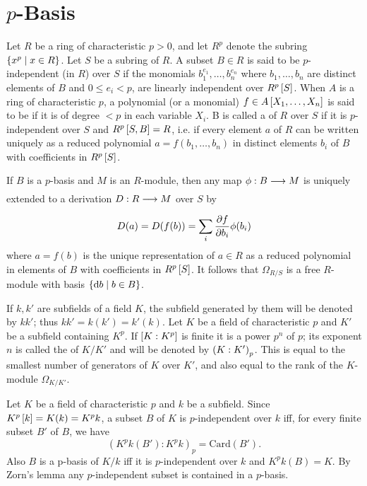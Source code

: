 \documentclass[../main]{subfiles}
\begin{document}
\section{\texorpdfstring{$p$}{p}-Basis}\label{sec:38}

\newparagraph
Let $R$ be a ring of characteristic $p > 0$, and let $R^p$ denote the subring $\left\{x^p \mid x \in R\right\}$. Let $S$ be a subring of $R$. A subset $B \in R$ is said to be $p$-independent (in $R$) over $S$ if the monomials $b_1^{e_1}, \dots, b_n^{e_n}$ where $b_1,\dots,b_n$ are distinct elements of $B$ and $0\le e_i < p$, are linearly independent over $R^p\left[S\right]$. When $A$ is a ring of characteristic $p$, a polynomial (or a monomial) $f \in A\left[X_1, \dots, X_n\right]$ is said to be  if it is of degree $< p$ in each variable $X_i$. B is called a  of $R$ over $S$ if it is $p$-independent over $S$ and $R^p\left[S,B\right] = R$, i.e. if every element $a$ of $R$ can be written uniquely as a reduced polynomial $a = f(b_1, \dots, b_n)$ in distinct elements $b_i$ of $B$ with coefficients in $R^p\left[S\right]$.

If $B$ is a $p$-basis and $M$ is an $R$-module, then any map $\phi: B \varrightarrow{} M$ is uniquely extended to a derivation $D: R \varrightarrow{} M$ over $S$ by \[D(a) = D(f(b)) = \sum_i \dfrac{\partial f}{\partial b_i}\phi(b_i)\] where $a=f(b)$ is the unique representation of $a \in R$ as a reduced polynomial in elements of $B$ with coefficients in $R^p\left[S\right]$. It follows that $\Omega_{R/S}$ is a free $R$-module with basis $\left\{\mathrm{d}b\mid b\in B\right\}$. 

\newparagraph
If $k,k'$ are subfields of a field $K$, the subfield generated by them will be denoted by $kk'$; thus $kk' = k(k') = k'(k)$. Let $K$ be a field of characteristic $p$ and $K'$ be a subfield containing $K^p$. If $\left[K:K^p\right]$ is finite it is a power $p^n$ of $p$; its exponent $n$ is called the  of $K/K'$ and will be denoted by $\left(K:K'\right)_p$. This is equal to the smallest number of generators of $K$ over $K'$, and also equal to the rank of the $K$-module $\Omega_{K/K'}$. 

Let $K$ be a field of characteristic $p$ and $k$ be a subfield. Since \newline $K^p\left[k\right] = K(k) = K^pk$, a subset $B$ of $K$ is $p$-independent over $k$ iff, for every finite subset $B'$ of $B$, we have \[(K^pk(B'):K^p k)_p = \mathrm{Card}(B').\] Also $B$ is a p-basis of $K/k$ iff it is $p$-independent over $k$ and $K^pk(B) =K$. By Zorn's lemma any $p$-independent subset is contained in a $p$-basis. 
\end{document}
